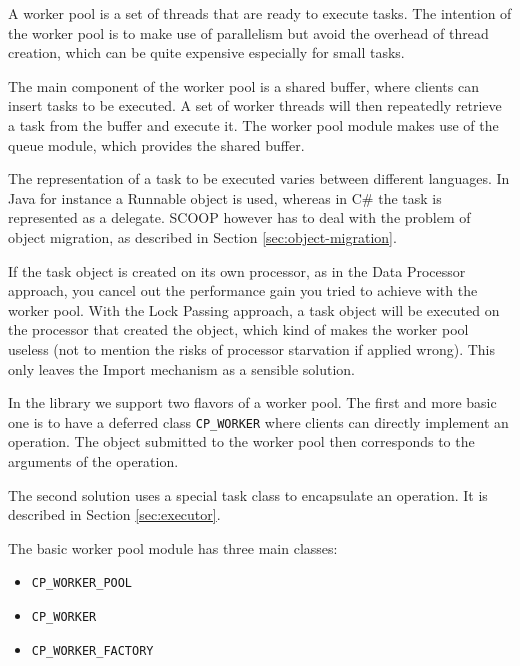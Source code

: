 A worker pool is a set of threads that are ready to execute tasks.
The intention of the worker pool is to make use of parallelism but avoid the overhead of thread creation, which can be quite expensive especially for small tasks.

The main component of the worker pool is a shared buffer, where clients can insert tasks to be executed.
A set of worker threads will then repeatedly retrieve a task from the buffer and execute it.
The worker pool module makes use of the queue module, which provides the shared buffer.

The representation of a task to be executed varies between different languages.
In Java for instance a Runnable object is used, whereas in C\# the task is represented as a delegate.
SCOOP however has to deal with the problem of object migration, as described in Section \ref{sec:object-migration}.

If the task object is created on its own processor, as in the Data Processor approach, you cancel out the performance gain you tried to achieve with the worker pool.
With the Lock Passing approach, a task object will be executed on the processor that created the object, which kind of makes the worker pool useless (not to mention the risks of processor starvation if applied wrong).
This only leaves the Import mechanism as a sensible solution.

In the library we support two flavors of a worker pool.
The first and more basic one is to have a deferred class \lstinline!CP_WORKER! where clients can directly implement an operation.
The object submitted to the worker pool then corresponds to the arguments of the operation.

The second solution uses a special task class to encapsulate an operation.
It is described in Section \ref{sec:executor}.


The basic worker pool module has three main classes:
\begin{itemize}
 \item \lstinline!CP_WORKER_POOL!
 \item \lstinline!CP_WORKER!
 \item \lstinline!CP_WORKER_FACTORY!
\end{itemize}

